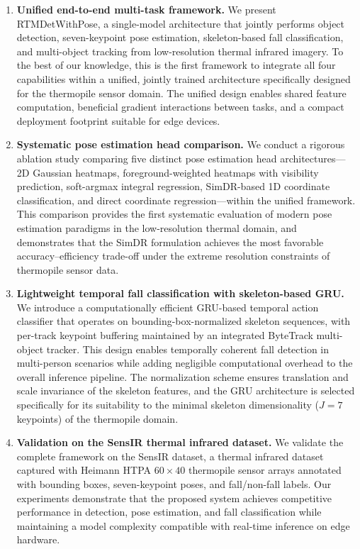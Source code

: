 \begin{enumerate}
    \item \textbf{Unified end-to-end multi-task framework.} We present RTMDetWithPose, a single-model architecture that jointly performs object detection, seven-keypoint pose estimation, skeleton-based fall classification, and multi-object tracking from low-resolution thermal infrared imagery. To the best of our knowledge, this is the first framework to integrate all four capabilities within a unified, jointly trained architecture specifically designed for the thermopile sensor domain. The unified design enables shared feature computation, beneficial gradient interactions between tasks, and a compact deployment footprint suitable for edge devices.

    \item \textbf{Systematic pose estimation head comparison.} We conduct a rigorous ablation study comparing five distinct pose estimation head architectures---2D Gaussian heatmaps, foreground-weighted heatmaps with visibility prediction, soft-argmax integral regression, SimDR-based 1D coordinate classification, and direct coordinate regression---within the unified framework. This comparison provides the first systematic evaluation of modern pose estimation paradigms in the low-resolution thermal domain, and demonstrates that the SimDR formulation achieves the most favorable accuracy--efficiency trade-off under the extreme resolution constraints of thermopile sensor data.

    \item \textbf{Lightweight temporal fall classification with skeleton-based GRU.} We introduce a computationally efficient GRU-based temporal action classifier that operates on bounding-box-normalized skeleton sequences, with per-track keypoint buffering maintained by an integrated ByteTrack multi-object tracker. This design enables temporally coherent fall detection in multi-person scenarios while adding negligible computational overhead to the overall inference pipeline. The normalization scheme ensures translation and scale invariance of the skeleton features, and the GRU architecture is selected specifically for its suitability to the minimal skeleton dimensionality ($J=7$ keypoints) of the thermopile domain.

    \item \textbf{Validation on the SensIR thermal infrared dataset.} We validate the complete framework on the SensIR dataset, a thermal infrared dataset captured with Heimann HTPA $60 \times 40$ thermopile sensor arrays annotated with bounding boxes, seven-keypoint poses, and fall/non-fall labels. Our experiments demonstrate that the proposed system achieves competitive performance in detection, pose estimation, and fall classification while maintaining a model complexity compatible with real-time inference on edge hardware.
\end{enumerate}

